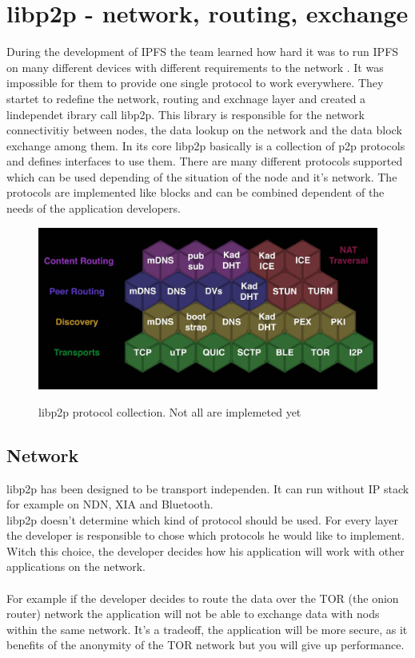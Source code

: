\documentclass[a4paper,11pt, oneside]{report}
\theoremstyle{definition}
\begin{document}
\section{libp2p - network, routing, exchange}
During the development of IPFS the team learned how hard it was to run IPFS on many different devices with different requirements to the network \cite{libp2pissues}. It was impossible for them to provide one single protocol to work everywhere. They startet to redefine the network, routing and exchnage layer and created a lindependet ibrary call libp2p. This library is responsible for the network connectivitiy between nodes, the data lookup on the network and the data block exchange among them. In its core libp2p basically is a collection of p2p protocols and defines interfaces to use them. There are many different protocols supported which can be used depending of the situation of the node and it's network. The protocols are implemented like blocks and can be combined dependent of the needs of the application developers.
\begin{figure}[H]
\centering
\includegraphics[width=\textwidth]{img/libp2p-blocks.png}\\[0.8cm]
\caption[libp2p]{libp2p protocol collection. Not all are implemeted yet}
\end{figure}
\noindent
\subsection{Network}
libp2p has been designed to be transport independen. It can run without IP stack for example on NDN, XIA and Bluetooth\cite{libp2pnoip}.\\ 
libp2p doesn't determine which kind of protocol should be used. For every layer the developer is responsible to chose which protocols he would like to implement. Witch this choice, the developer decides how his application will work with other applications on the network.\\ \\
For example if the developer decides to route the data over the TOR (the onion router) network the application will not be able to exchange data with nods within the same network. It's a tradeoff, the application will be more secure, as it benefits of the anonymity of the TOR network but you will give up performance. 
\end{document}
